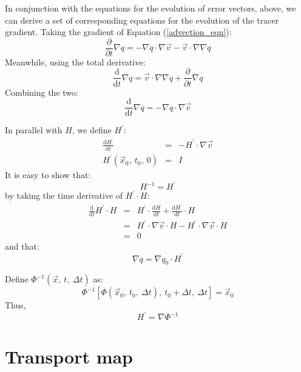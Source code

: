 \documentclass[11pt]{article}
\begin{document}
In conjunction with the equations for the evolution of error vectors, above,
we can derive a set of corresponding equations for the evolution of the tracer
gradient.  Taking the gradient of Equation (\ref{advection_eqn}):
\begin{equation}
\frac{\partial}{\partial t} \nabla q = -\nabla q \cdot \nabla \vec v -
		\vec v \cdot \nabla \nabla q 
\end{equation}
Meanwhile, using the total derivative:
\begin{equation}
\frac{\mathrm d}{\mathrm d t} \nabla q = \vec v \cdot \nabla \nabla q + 
		\frac{\partial}{\partial t} \nabla q
\end{equation}
Combining the two:
\begin{equation}
\frac{\mathrm d}{\mathrm d t} \nabla q = -\nabla q \cdot \nabla \vec v
\label{evolution_tracer_gradient}
\end{equation}

In parallel with $H$, we define $H^\prime$:
\begin{eqnarray}
\frac{\mathrm d H^\prime}{\mathrm d t} & = & -H^\prime \cdot \nabla \vec v\\
\label{inverse_deformation_matrix}
H^\prime(\vec x_0,~t_0,~0) & = & I
\end{eqnarray}
It is easy to show that:
\begin{equation}
H^{-1}=H^\prime
\end{equation}
by taking the time derivative of $H^\prime \cdot H$:
\begin{eqnarray}
\frac{\mathrm d}{\mathrm d t} H^\prime \cdot H & = & 
		H^\prime \cdot \frac{\mathrm d H}{\mathrm d t} +
		\frac{\mathrm d H^\prime}{\mathrm d t} \cdot H\\
		& = & H^\prime \cdot \nabla \vec v \cdot H 
		- H^\prime \cdot \nabla \vec v \cdot H \\
		& = & 0
\end{eqnarray}
and that:
\begin{equation}
\nabla q = \nabla q_0 \cdot H^\prime
\end{equation}

Define $\Phi^{-1}(\vec x,~t,~\Delta t)$ as:
\begin{equation}
\Phi^{-1}[\Phi(\vec x_0,~t_0,~\Delta t),~t_0+\Delta t,~\Delta t]=\vec x_0
\end{equation}
Thus,
\begin{equation}
H^\prime=\nabla \Phi^{-1}
\end{equation}

\section{Transport map}
\end{document}
